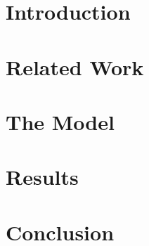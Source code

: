 \section{Introduction}


\section{Related Work}


\section{The Model}


\section{Results}


\section{Conclusion}


